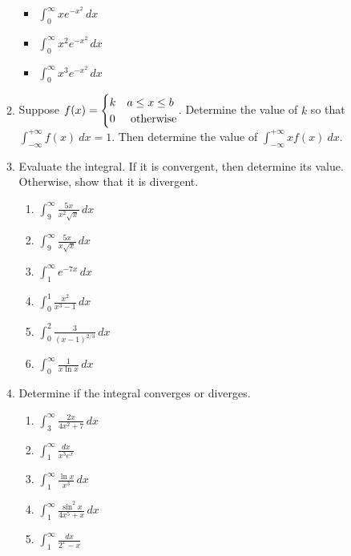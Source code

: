 \documentclass{article}
\begin{document}
\begin{itemize}
\begin{enumerate}
\begin{itemize}
                            \item $\displaystyle \int_0^\infty xe^{-x^2}\,dx$
                            \item $\displaystyle \int_0^\infty x^2e^{-x^2}\,dx$
                            \item $\displaystyle \int_0^\infty x^3e^{-x^2}\,dx$
                        \end{itemize}
                    \item Suppose $f(x)=\begin{cases} k & a\leq x\leq b \\ 0 & \textnormal{ otherwise} \end{cases}$.  Determine the value of $k$ so that $\displaystyle \int_{-\infty}^{+\infty} f(x)\ dx =1$.  Then determine the value of $\displaystyle \int_{-\infty}^{+\infty} xf(x)\ dx$.
                    \item Evaluate the integral.  If it is convergent, then determine its value.  Otherwise, show that it is divergent.
                        \begin{enumerate}
                            \item $\displaystyle \int_9^\infty \frac{5x}{x^2\sqrt{x}}\,dx$
                            \item $\displaystyle \int_9^\infty \frac{5x}{x\sqrt{x}}\,dx$
                            \item $\displaystyle \int_1^\infty e^{-7x}\, dx$
                            \item $\displaystyle \int_{0}^1 \frac{x^2}{x^3-1}\, dx$
                            \item $\displaystyle \int_{0}^2 \frac {3}{(x-1)^{2/3}}\, dx$
                            \item $\displaystyle \int_0^\infty \frac{1}{x\ln{x}}\,dx$
                        \end{enumerate}
                    \item Determine if the integral converges or diverges.
                        \begin{enumerate}
                            \item $\displaystyle \int_3^\infty \frac{2x}{4x^2+7}\, dx$
                            \item $\displaystyle \int_1^\infty \frac{dx}{x^3e^x}$
                            \item $\displaystyle \int_1^\infty \frac{\ln x}{x^3}\, dx$
                            \item $\displaystyle \int_1^\infty \frac{\sin^2 x}{4x^5+x}\, dx$
                            \item $\displaystyle \int_1^\infty \frac{dx}{2^x-x}$
                        \end{enumerate}
                \end{enumerate}
        \end{itemize}
\end{document}
